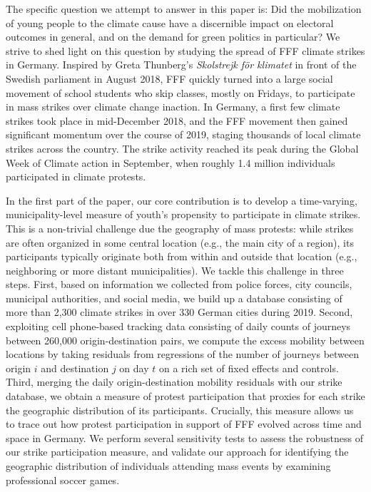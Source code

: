 The specific question we attempt to answer in this paper is: Did the mobilization of young people to the climate cause have a discernible impact on electoral outcomes in general, and on the demand for green politics in particular? We strive to shed light on this question by studying the spread of FFF climate strikes in Germany. Inspired by Greta Thunberg's \emph{Skolstrejk f\"{o}r klimatet} in front of the Swedish parliament in August 2018, FFF quickly turned into a large social movement of school students who skip classes, mostly on Fridays, to participate in mass strikes over climate change inaction. In Germany, a first few climate strikes took place in mid-December 2018, and the FFF movement then gained significant momentum over the course of 2019, staging thousands of local climate strikes across the country. The strike activity reached its peak during the Global Week of Climate action in September, when roughly 1.4 million individuals participated in climate protests.  

In the first part of the paper, our core contribution is to develop a time-varying, municipality-level measure of youth's propensity to participate in climate strikes. This is a non-trivial challenge due the geography of mass protests: while strikes are often organized in some central location (e.g., the main city of a region), its participants typically originate both from within and outside that location (e.g., neighboring or more distant municipalities). We tackle this challenge in three steps. First, based on information we collected from police forces, city councils, municipal authorities, and social media, we build up a database consisting of more than 2,300 climate strikes in over 330 German cities during 2019. Second, exploiting cell phone-based tracking data consisting of daily counts of journeys between 260,000 origin-destination pairs, we compute the excess mobility between locations by taking residuals from regressions of the number of journeys between origin $i$ and destination $j$ on day $t$ on a rich set of fixed effects and controls. Third, merging the daily origin-destination mobility residuals with our strike database, we obtain a measure of protest participation that proxies for each strike the geographic distribution of its participants. Crucially, this measure allows us to trace out how protest participation in support of FFF evolved across time and space in Germany. We perform several sensitivity tests to assess the robustness of our strike participation measure, and validate our approach for identifying the geographic distribution of individuals attending mass events by examining professional soccer games.  

